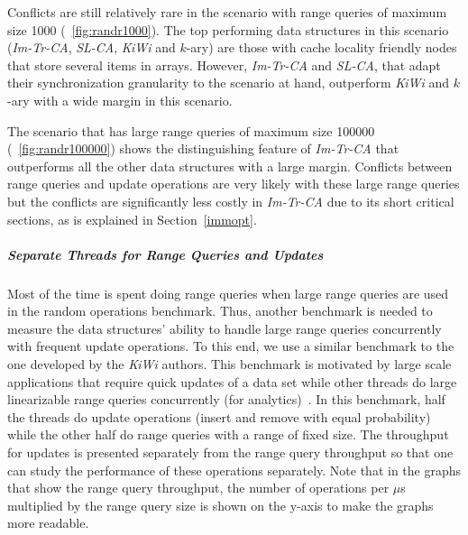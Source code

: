 \documentclass[a4paper,UKenglish]{oasics}
\newcommand{\kary}{\mbox{$k$-ary}\xspace}
\begin{document}
Conflicts are still relatively rare in the scenario with range queries of maximum size 1000 (\figurename~\ref{fig:randr1000}).
The top performing data structures in this scenario (\emph{Im-Tr-CA}, \emph{SL-CA}, \emph{KiWi} and \kary{}) are those with cache locality friendly nodes that store several items in arrays.
However, \emph{Im-Tr-CA} and \emph{SL-CA}, that adapt their synchronization granularity to the scenario at hand, outperform \emph{KiWi} and \kary{} with a wide margin in this scenario.

The scenario that has large range queries of maximum size 100000 (\figurename~\ref{fig:randr100000}) shows the distinguishing feature of \emph{Im-Tr-CA} that outperforms all the other data structures with a large margin.
Conflicts between range queries and update operations are very likely with these large range queries but the conflicts are significantly less costly in \emph{Im-Tr-CA} due to its short critical sections, as is explained in Section~\ref{immopt}.
\subparagraph{Separate Threads for Range Queries and Updates}
Most of the time is spent doing range queries when large range queries are used in the random operations benchmark.
Thus, another benchmark is needed to measure the data structures' ability to handle large range queries concurrently with frequent update operations.
To this end, we use a similar benchmark to the one developed by the \emph{KiWi} authors.
This benchmark is motivated by large scale applications that require quick updates of a data set while other threads do large linearizable range queries concurrently (for analytics)~\cite{BasinKiWi}.
In this benchmark, half the threads do update operations (insert and remove with equal probability) while the other half do range queries with a range of fixed size.
The throughput for updates is presented separately from the range query throughput so that one can study the performance of these operations separately.
Note that in the graphs that show the range query throughput, the number of operations per $\mu$s multiplied by the range query size is shown on the y-axis to make the graphs more readable.
\end{document}
